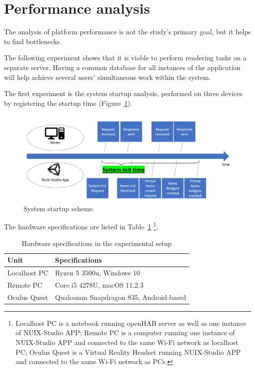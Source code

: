 \section{Performance analysis}

The analysis of platform performance is not the study's primary goal, but it helps to find bottlenecks. 

The following experiment shows that it is viable to perform rendering tasks on a separate server. Having a common database for all instances of the application will help achieve several users' simultaneous work within the system.

The first experiment is the system startup analysis, performed on three devices by registering the startup time (Figure~\ref{fig:SystemStartupScheme-figure}).

\begin{figure}
  \centering
  \includegraphics[width = 0.9 \linewidth]{figures/SystemStartupScheme.png}
  \caption{System startup scheme.}
  \label{fig:SystemStartupScheme-figure}
\end{figure}

The hardware specifications are listed in Table~\ref{tab:hardware-specifications-table} \footnote{Localhost PC is a notebook running openHAB server as well as one instance of NUIX-Studio APP; Remote PC is a computer running one instance of NUIX-Studio APP and connected to the same Wi-Fi network as localhost PC; Oculus Quest is a Virtual Reality Headset running NUIX-Studio APP and connected to the same Wi-Fi network as PCs.}.

\begin{table}
  \centering
  \begin{threeparttable}[c]
    \caption{Hardware specifications in the experimental setup}
    \label{tab:hardware-specifications-table}
    \begin{tabular}{ll}
      \toprule
      Unit    &         Specifications                 \\
      \midrule
      Localhost PC & Ryzen 5 3500u, Windows 10 \\
      Remote PC & Core i5 4278U, macOS 11.2.3    \\
      Oculus Quest        & Qualcomm Snapdragon 835, Android-based            \\
      \bottomrule
    \end{tabular}
  \end{threeparttable}
\end{table}

